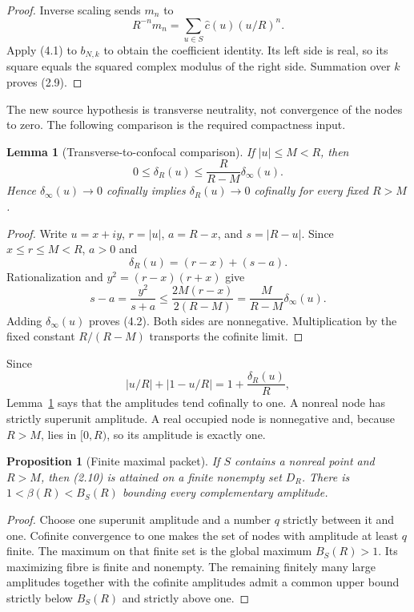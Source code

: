 \documentclass[11pt]{article}
\newtheorem{proposition}[theorem]{Proposition}
\newtheorem{lemma}[theorem]{Lemma}
\theoremstyle{remark}
\begin{document}
\begin{proof}
Inverse scaling sends $m_n$ to
\[
 R^{-n}m_n=\sum_{u\in S}\widehat c(u)(u/R)^n.
\]
Apply (4.1) to $b_{N,k}$ to obtain the coefficient identity.  Its left side is real, so its
square equals the squared complex modulus of the right side.  Summation over $k$ proves (2.9).
\end{proof}

The new source hypothesis is transverse neutrality, not convergence of the nodes to zero.  The
following comparison is the required compactness input.

\begin{lemma}[Transverse-to-confocal comparison]
\label{lem:neutrality}
If $|u|\le M<R$, then
\begin{equation}
 0\le\delta_R(u)\le\frac{R}{R-M}\delta_\infty(u).
 \tag{4.2}
\end{equation}
Hence $\delta_\infty(u)\to0$ cofinally implies $\delta_R(u)\to0$ cofinally for every fixed
$R>M$.
\end{lemma}

\begin{proof}
Write $u=x+iy$, $r=|u|$, $a=R-x$, and $s=|R-u|$.  Since $x\le r\le M<R$, $a>0$ and
\[
 \delta_R(u)=(r-x)+(s-a).
\]
Rationalization and $y^2=(r-x)(r+x)$ give
\[
 s-a=\frac{y^2}{s+a}
 \le\frac{2M(r-x)}{2(R-M)}
 =\frac{M}{R-M}\delta_\infty(u).
\]
Adding $\delta_\infty(u)$ proves (4.2).  Both sides are nonnegative.  Multiplication by the fixed
constant $R/(R-M)$ transports the cofinite limit.
\end{proof}

Since
\begin{equation}
 |u/R|+|1-u/R|=1+\frac{\delta_R(u)}R,
 \tag{4.3}
\end{equation}
Lemma~\ref{lem:neutrality} says that the amplitudes tend cofinally to one.  A nonreal node has
strictly superunit amplitude.  A real occupied node is nonnegative and, because $R>M$, lies in
$[0,R)$, so its amplitude is exactly one.

\begin{proposition}[Finite maximal packet]
\label{prop:maxpacket}
If $S$ contains a nonreal point and $R>M$, then (2.10) is attained on a finite nonempty set
$D_R$.  There is $1<\beta(R)<B_S(R)$ bounding every complementary amplitude.
\end{proposition}

\begin{proof}
Choose one superunit amplitude and a number $q$ strictly between it and one.  Cofinite convergence
to one makes the set of nodes with amplitude at least $q$ finite.  The maximum on that finite set
is the global maximum $B_S(R)>1$.  Its maximizing fibre is finite and nonempty.  The remaining
finitely many large amplitudes together with the cofinite amplitudes admit a common upper bound
strictly below $B_S(R)$ and strictly above one.
\end{proof}
\end{document}
